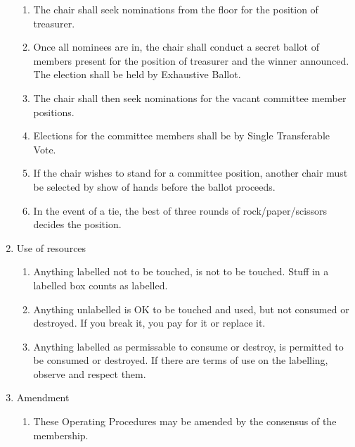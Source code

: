 \documentclass{article}
\begin{document}
\begin{enumerate}
\begin{enumerate}
  \item The chair shall seek nominations from the floor for the
    position of treasurer.
  \item Once all nominees are in, the chair shall conduct a secret
    ballot of members present for the position of treasurer and the
    winner announced. The election shall be held by Exhaustive Ballot.
  \item The chair shall then seek nominations for the vacant committee
    member positions.
  \item Elections for the committee members shall be by Single
    Transferable Vote.
  \item If the chair wishes to stand for a committee position, another
    chair must be selected by show of hands before the ballot proceeds.
  \item In the event of a tie, the best of three rounds of
    rock/paper/scissors decides the position.
  \end{enumerate}
\item Use of resources
  \begin{enumerate}
  \item Anything labelled not to be touched, is not to be
    touched. Stuff in a labelled box counts as labelled.
  \item Anything unlabelled is OK to be touched and used, but not
    consumed or destroyed. If you break it, you pay for it or replace
    it.
  \item Anything labelled as permissable to consume or destroy, is
    permitted to be consumed or destroyed. If there are terms of use
    on the labelling, observe and respect them.
  \end{enumerate}
\item Amendment
  \begin{enumerate}
  \item These Operating Procedures may be amended by the consensus of
    the membership.
  \end{enumerate} %
\end{enumerate}
\end{document}
